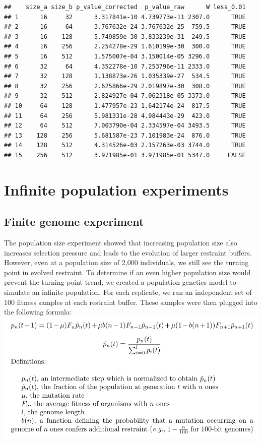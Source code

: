\documentclass[
]{book}
\begin{document}
\begin{verbatim}
##    size_a size_b p_value_corrected  p_value_raw      W less_0.01
## 1      16     32      3.317841e-10 4.739773e-11 2307.0      TRUE
## 2      16     64      3.767632e-24 3.767632e-25  759.5      TRUE
## 3      16    128      5.749859e-30 3.833239e-31  249.5      TRUE
## 4      16    256      2.254278e-29 1.610199e-30  300.0      TRUE
## 5      16    512      1.575007e-04 3.150014e-05 3296.0      TRUE
## 6      32     64      4.352278e-10 7.253796e-11 2333.0      TRUE
## 7      32    128      1.138873e-26 1.035339e-27  534.5      TRUE
## 8      32    256      2.625866e-29 2.019897e-30  308.0      TRUE
## 9      32    512      2.824927e-04 7.062318e-05 3373.0      TRUE
## 10     64    128      1.477957e-23 1.642174e-24  817.5      TRUE
## 11     64    256      5.981331e-28 4.984443e-29  423.0      TRUE
## 12     64    512      7.003790e-04 2.334597e-04 3493.5      TRUE
## 13    128    256      5.681587e-23 7.101983e-24  876.0      TRUE
## 14    128    512      4.314526e-03 2.157263e-03 3744.0      TRUE
## 15    256    512      3.971985e-01 3.971985e-01 5347.0     FALSE
\end{verbatim}

\hypertarget{infinite-population-experiments}{%
\chapter{Infinite population experiments}\label{infinite-population-experiments}}

\hypertarget{finite-genome-experiment}{%
\section{Finite genome experiment}\label{finite-genome-experiment}}

The population size experiment showed that increasing population size also increases selection pressure and leads to the evolution of larger restraint buffers.
However, even at a population size of 2,000 individuals, we still see the turning point in evolved restraint.
To determine if an even higher population size would prevent the turning point trend, we created a population genetics model to simulate an infinite population.
For each replicate, we ran an independent set of 100 fitness samples at each restraint buffer.
These samples were then plugged into the following formula:
\includegraphics{./inf_pop/formula.png}
\end{document}
